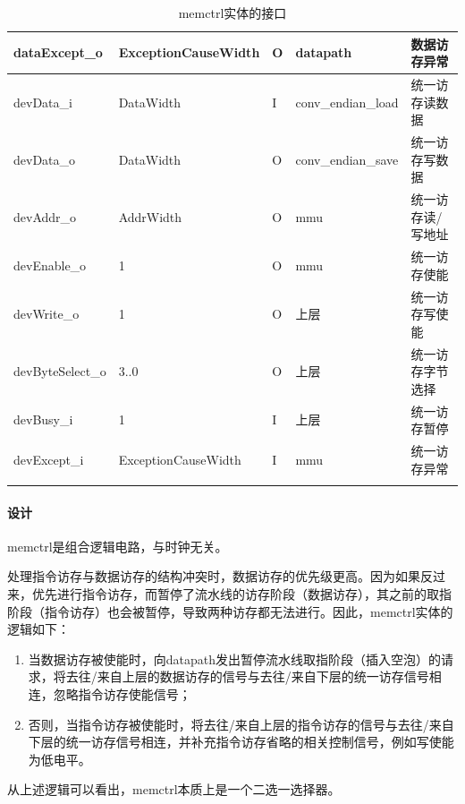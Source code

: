 \documentclass{article}
\begin{document}
\begin{spacing}{1.4}
\begin{longtable}{l|l|l|l|p{5cm}}
\hline dataExcept\_o           & ExceptionCauseWidth    & O     & datapath      & 数据访存异常 \\
\hline devData\_i              & DataWidth              & I     & conv\_endian\_load & 统一访存读数据 \\
\hline devData\_o              & DataWidth              & O     & conv\_endian\_save & 统一访存写数据 \\
\hline devAddr\_o              & AddrWidth              & O     & mmu           & 统一访存读/写地址 \\
\hline devEnable\_o            & 1                      & O     & mmu           & 统一访存使能 \\
\hline devWrite\_o             & 1                      & O     & 上层          & 统一访存写使能 \\
\hline devByteSelect\_o        & 3..0                   & O     & 上层          & 统一访存字节选择 \\
\hline devBusy\_i              & 1                      & I     & 上层          & 统一访存暂停 \\
\hline devExcept\_i            & ExceptionCauseWidth    & I     & mmu           & 统一访存异常 \\
\hline
\caption{memctrl实体的接口}
\label{tb:memctrl-interface}
\end{longtable}

\paragraph{设计}\mbox{}

memctrl是组合逻辑电路，与时钟无关。

处理指令访存与数据访存的结构冲突时，数据访存的优先级更高。因为如果反过来，优先进行指令访存，而暂停了流水线的访存阶段（数据访存），其之前的取指阶段（指令访存）也会被暂停，导致两种访存都无法进行。因此，memctrl实体的逻辑如下：

\begin{enumerate}
    \item 当数据访存被使能时，向datapath发出暂停流水线取指阶段（插入空泡）的请求，将去往/来自上层的数据访存的信号与去往/来自下层的统一访存信号相连，忽略指令访存使能信号；
    \item 否则，当指令访存被使能时，将去往/来自上层的指令访存的信号与去往/来自下层的统一访存信号相连，并补充指令访存省略的相关控制信号，例如写使能为低电平。
\end{enumerate}

从上述逻辑可以看出，memctrl本质上是一个二选一选择器。


\end{spacing}
\end{document}
